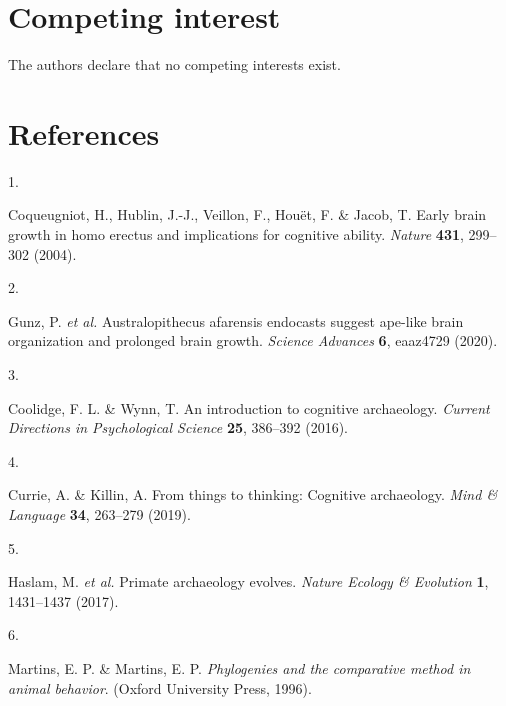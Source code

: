 \documentclass[
  man,floatsintext]{apa6}
\newlength{\cslhangindent}
\newlength{\csllabelwidth}
\newlength{\cslentryspacingunit} %
\newenvironment{CSLReferences}[2] %
 {%
  \setlength{\parindent}{0pt}
  \ifodd #1
  \let\oldpar\par
  \def\par{\hangindent=\cslhangindent\oldpar}
  \fi
  \setlength{\parskip}{#2\cslentryspacingunit}
 }%
 {}
\newcommand{\CSLLeftMargin}[1]{\parbox[t]{\csllabelwidth}{#1}}
\newcommand{\CSLRightInline}[1]{\parbox[t]{\linewidth - \csllabelwidth}{#1}\break}
\begin{document}
\hypertarget{competing-interest}{%
\section{Competing interest}\label{competing-interest}}

The authors declare that no competing interests exist.

\newpage

\hypertarget{references}{%
\section{References}\label{references}}

\begingroup
\setlength{\parindent}{-0.5in}
\setlength{\leftskip}{0.5in}

\hypertarget{refs}{}
\begin{CSLReferences}{0}{0}
\leavevmode{}%
\CSLLeftMargin{1. }%
\CSLRightInline{Coqueugniot, H., Hublin, J.-J., Veillon, F., Houët, F. \& Jacob, T. Early brain growth in homo erectus and implications for cognitive ability. \emph{Nature} \textbf{431}, 299--302 (2004).}

\leavevmode{}%
\CSLLeftMargin{2. }%
\CSLRightInline{Gunz, P. \emph{et al.} Australopithecus afarensis endocasts suggest ape-like brain organization and prolonged brain growth. \emph{Science Advances} \textbf{6}, eaaz4729 (2020).}

\leavevmode{}%
\CSLLeftMargin{3. }%
\CSLRightInline{Coolidge, F. L. \& Wynn, T. An introduction to cognitive archaeology. \emph{Current Directions in Psychological Science} \textbf{25}, 386--392 (2016).}

\leavevmode{}%
\CSLLeftMargin{4. }%
\CSLRightInline{Currie, A. \& Killin, A. From things to thinking: Cognitive archaeology. \emph{Mind \& Language} \textbf{34}, 263--279 (2019).}

\leavevmode{}%
\CSLLeftMargin{5. }%
\CSLRightInline{Haslam, M. \emph{et al.} Primate archaeology evolves. \emph{Nature Ecology \& Evolution} \textbf{1}, 1431--1437 (2017).}

\leavevmode{}%
\CSLLeftMargin{6. }%
\CSLRightInline{Martins, E. P. \& Martins, E. P. \emph{Phylogenies and the comparative method in animal behavior}. (Oxford University Press, 1996).}


\end{CSLReferences}
\end{document}

